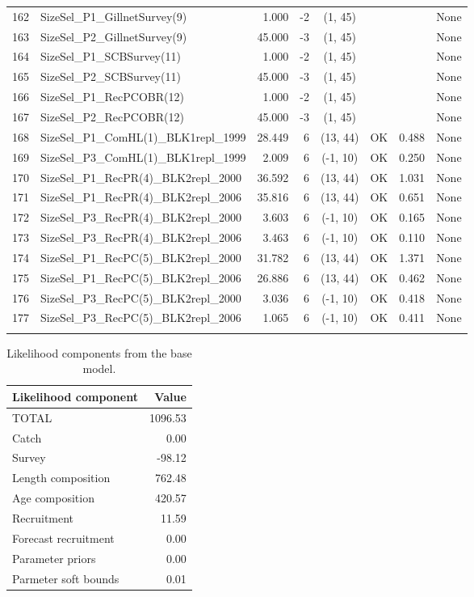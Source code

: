 \documentclass[12pt,]{article}
\begin{document}
\begin{landscape}
\begin{longtable}{rlrrcccl}
  162 & SizeSel\_P1\_GillnetSurvey(9) & 1.000 & -2 & (1, 45) &  &  & None \\ 
  163 & SizeSel\_P2\_GillnetSurvey(9) & 45.000 & -3 & (1, 45) &  &  & None \\ 
  164 & SizeSel\_P1\_SCBSurvey(11) & 1.000 & -2 & (1, 45) &  &  & None \\ 
  165 & SizeSel\_P2\_SCBSurvey(11) & 45.000 & -3 & (1, 45) &  &  & None \\ 
  166 & SizeSel\_P1\_RecPCOBR(12) & 1.000 & -2 & (1, 45) &  &  & None \\ 
  167 & SizeSel\_P2\_RecPCOBR(12) & 45.000 & -3 & (1, 45) &  &  & None \\ 
  168 & SizeSel\_P1\_ComHL(1)\_BLK1repl\_1999 & 28.449 & 6 & (13, 44) & OK & 0.488 & None \\ 
  169 & SizeSel\_P3\_ComHL(1)\_BLK1repl\_1999 & 2.009 & 6 & (-1, 10) & OK & 0.250 & None \\ 
  170 & SizeSel\_P1\_RecPR(4)\_BLK2repl\_2000 & 36.592 & 6 & (13, 44) & OK & 1.031 & None \\ 
  171 & SizeSel\_P1\_RecPR(4)\_BLK2repl\_2006 & 35.816 & 6 & (13, 44) & OK & 0.651 & None \\ 
  172 & SizeSel\_P3\_RecPR(4)\_BLK2repl\_2000 & 3.603 & 6 & (-1, 10) & OK & 0.165 & None \\ 
  173 & SizeSel\_P3\_RecPR(4)\_BLK2repl\_2006 & 3.463 & 6 & (-1, 10) & OK & 0.110 & None \\ 
  174 & SizeSel\_P1\_RecPC(5)\_BLK2repl\_2000 & 31.782 & 6 & (13, 44) & OK & 1.371 & None \\ 
  175 & SizeSel\_P1\_RecPC(5)\_BLK2repl\_2006 & 26.886 & 6 & (13, 44) & OK & 0.462 & None \\ 
  176 & SizeSel\_P3\_RecPC(5)\_BLK2repl\_2000 & 3.036 & 6 & (-1, 10) & OK & 0.418 & None \\ 
  177 & SizeSel\_P3\_RecPC(5)\_BLK2repl\_2006 & 1.065 & 6 & (-1, 10) & OK & 0.411 & None \\ 
   \hline
\hline
\label{tab:model_params}
\end{longtable}
\end{landscape}

\FloatBarrier

\begin{table}[ht]
\centering
\caption{Likelihood components from the base model.} 
\label{tab:like_components}
\begin{tabular}{lr}
  \hline
Likelihood component & Value \\ 
  \hline
TOTAL & 1096.53 \\ 
  Catch & 0.00 \\ 
  Survey & -98.12 \\ 
  Length composition & 762.48 \\ 
  Age composition & 420.57 \\ 
  Recruitment & 11.59 \\ 
  Forecast recruitment & 0.00 \\ 
  Parameter priors & 0.00 \\ 
  Parmeter soft bounds & 0.01 \\ 
   \hline
\end{tabular}
\end{table}
\end{document}
